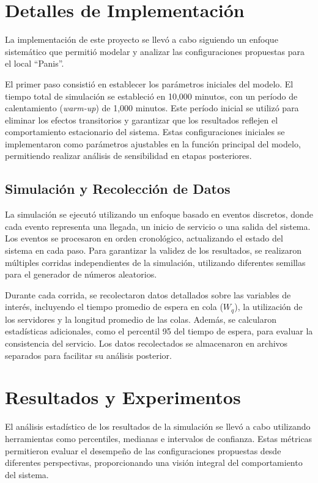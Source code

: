 \documentclass[a4paper,12pt]{article}
\begin{document}
\section{Detalles de Implementación}

La implementación de este proyecto se llevó a cabo siguiendo un enfoque sistemático que permitió modelar y analizar las configuraciones propuestas para el local “Panis”.

El primer paso consistió en establecer los parámetros iniciales del modelo. 
El tiempo total de simulación se estableció en 10,000 minutos, con un período de calentamiento (\textit{warm-up}) de 1,000 minutos. Este período inicial se utilizó para eliminar los efectos transitorios y garantizar que los resultados reflejen el comportamiento estacionario del sistema. Estas configuraciones iniciales se implementaron como parámetros ajustables en la función principal del modelo, permitiendo realizar análisis de sensibilidad en etapas posteriores.

\subsection{Simulación y Recolección de Datos}

La simulación se ejecutó utilizando un enfoque basado en eventos discretos, donde cada evento representa una llegada, un inicio de servicio o una salida del sistema. Los eventos se procesaron en orden cronológico, actualizando el estado del sistema en cada paso. Para garantizar la validez de los resultados, se realizaron múltiples corridas independientes de la simulación, utilizando diferentes semillas para el generador de números aleatorios.

Durante cada corrida, se recolectaron datos detallados sobre las variables de interés, incluyendo el tiempo promedio de espera en cola ($W_q$), la utilización de los servidores y la longitud promedio de las colas. Además, se calcularon estadísticas adicionales, como el percentil 95 del tiempo de espera, para evaluar la consistencia del servicio. Los datos recolectados se almacenaron en archivos separados para facilitar su análisis posterior.

\section{Resultados y Experimentos}
El análisis estadístico de los resultados de la simulación se llevó a cabo utilizando herramientas como percentiles, medianas e intervalos de confianza. Estas métricas permitieron evaluar el desempeño de las configuraciones propuestas desde diferentes perspectivas, proporcionando una visión integral del comportamiento del sistema.
\end{document}
